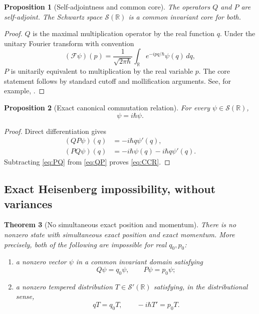 \documentclass[11pt]{amsart}
\numberwithin{equation}{section}
\theoremstyle{plain}
\newtheorem{theorem}{Theorem}[section]
\newtheorem{proposition}[theorem]{Proposition}
\theoremstyle{definition}
\theoremstyle{remark}
\newcommand{\R}{\mathbb{R}}
\newcommand{\Sch}{\mathcal{S}}
\newcommand{\Four}{\mathcal{F}}
\begin{document}
\begin{proposition}[Self-adjointness and common core]
\label{prop:self_adjoint_QP}
The operators $Q$ and $P$ are self-adjoint.  The Schwartz space
$\Sch(\R)$ is a common invariant core for both.
\end{proposition}

\begin{proof}
$Q$ is the maximal multiplication operator by the real function $q$.  Under
the unitary Fourier transform with convention
\begin{equation}
(\Four\psi)(p)
=
\frac{1}{\sqrt{2\pi\hbar}}
\int_{\R}e^{-ipq/\hbar}\psi(q)\,dq,
\label{eq:fourier_transform}
\end{equation}
$P$ is unitarily equivalent to multiplication by the real variable $p$.
The core statement follows by standard cutoff and mollification arguments.
See, for example, \cite{ReedSimon1980}.
\end{proof}

\begin{proposition}[Exact canonical commutation relation]
\label{prop:CCR}
For every $\psi\in\Sch(\R)$,
\begin{equation}
[Q,P]\psi=i\hbar\psi.
\label{eq:CCR}
\end{equation}
\end{proposition}

\begin{proof}
Direct differentiation gives
\begin{align}
(QP\psi)(q)
&=-i\hbar q\psi'(q),
\label{eq:QP}\\
(PQ\psi)(q)
&=-i\hbar\psi(q)-i\hbar q\psi'(q).
\label{eq:PQ}
\end{align}
Subtracting \eqref{eq:PQ} from \eqref{eq:QP} proves \eqref{eq:CCR}.
\end{proof}

\subsection{Exact Heisenberg impossibility, without variances}
\label{subsec:heisenberg_impossibility}

\begin{theorem}[No simultaneous exact position and momentum]
\label{thm:no_joint_eigenstate}
There is no nonzero state with simultaneous exact position and exact momentum.
More precisely, both of the following are impossible for real $q_0,p_0$:
\begin{enumerate}[leftmargin=*]
\item a nonzero vector $\psi$ in a common invariant domain satisfying
\begin{equation}
Q\psi=q_0\psi,
\qquad
P\psi=p_0\psi;
\label{eq:joint_eigenstate_assumption}
\end{equation}
\item a nonzero tempered distribution $T\in\Sch'(\R)$ satisfying, in the
distributional sense,
\begin{equation}
qT=q_0T,
\qquad
-i\hbar T'=p_0T.
\label{eq:joint_distribution_assumption}
\end{equation}
\end{enumerate}
\end{theorem}
\end{document}
